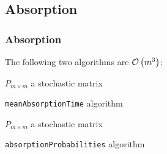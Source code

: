 \subsection{Absorption}
 \begin{frame}\frametitle{Absorption}
    \vspace{3em}
    The following two algorithms are \(\mathcal{O}\left(m^3\right)\):
    \vspace{-1em}
    \begin{algorithm}[H]
    \begin{algorithmic}[1]
    \REQUIRE $P_{m \times m}$ a stochastic matrix
    \NEWLINE
    \caption{\small\texttt{meanAbsorptionTime} algorithm}
    \label{alg:meanAbsorptionTime}
    \end{algorithmic}
    \end{algorithm}

    \vspace{-2em}
    
    \begin{algorithm}[H]
    \begin{algorithmic}[1]
    \REQUIRE $P_{m \times m}$ a stochastic matrix
    \NEWLINE
    \caption{\small\texttt{absorptionProbabilities} algorithm}
    \label{alg:absorptionProbabilities}
    \end{algorithmic}
    \end{algorithm}
    
\end{frame}
